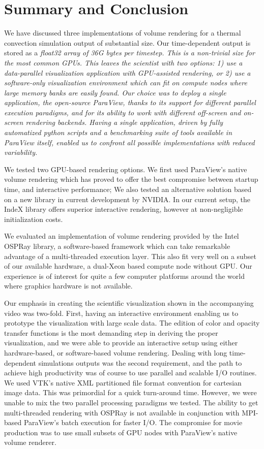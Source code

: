 \documentclass[5p,times]{elsarticle}
\begin{document}
\section{Summary and Conclusion}

We have discussed three implementations of volume rendering for a thermal convection
simulation output of substantial size. Our time-dependent output is stored as a
\it{float32} \rm array of 36G bytes per timestep. This is a non-trivial size for the most common
GPUs. This leaves the scientist with two options: 1) use a data-parallel visualization
application with GPU-assisted rendering, or 2) use a \it{software-only} \rm
visualization environment which can fit on compute nodes where large memory
banks are easily found. Our choice was to deploy a single application, the open-source
ParaView, thanks to its support for different parallel execution paradigms, and for its ability to work with different off-screen and on-screen rendering backends. Having a single application,
driven by fully automatized python scripts and a benchmarking suite of tools
available in ParaView itself, enabled us to confront all possible implementations with reduced variability.

We tested two GPU-based rendering options. We first used ParaView's native volume rendering which has proved to offer the best compromise between startup time, and interactive performance; We also tested an alternative solution based on a new library in current development by NVIDIA. In our current setup, the IndeX library offers superior interactive rendering, however at non-negligible initialization costs.

We evaluated an implementation of volume rendering provided by the Intel OSPRay library,
a software-based framework which can take remarkable advantage of a multi-threaded
execution layer. This also fit very well on a subset of our available hardware, a dual-Xeon based compute node without GPU. Our experience is of interest for quite a few computer platforms around the world where graphics hardware is not available. 

Our emphasis in creating the scientific visualization shown in the accompanying video was two-fold. 
First, having an interactive environment enabling us to prototype the visualization with large scale data. The edition of color and opacity transfer functions is the most demanding step in
deriving the proper visualization, and we were able to provide an interactive setup using either hardware-based, or software-based volume rendering. Dealing with long time-dependent simulations outputs was the second requirement, and the path to achieve high productivity was of course to use parallel and scalable I/O routines. We used VTK's native XML partitioned file format convention for cartesian image data. This was primordial for a quick turn-around time. However, we were unable to mix the two parallel processing paradigms we tested. The ability to get multi-threaded rendering with OSPRay is not available in conjunction with MPI-based ParaView's batch execution for faster I/O. The compromise for movie production was to use small subsets of GPU nodes with ParaView's native volume renderer.
\end{document}
